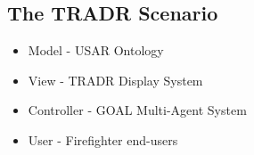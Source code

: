 \subsection{The TRADR Scenario}
\begin{itemize}
\item Model - USAR Ontology
\item View - TRADR Display System
\item Controller - GOAL Multi-Agent System
\item User - Firefighter end-users
\end{itemize}
  